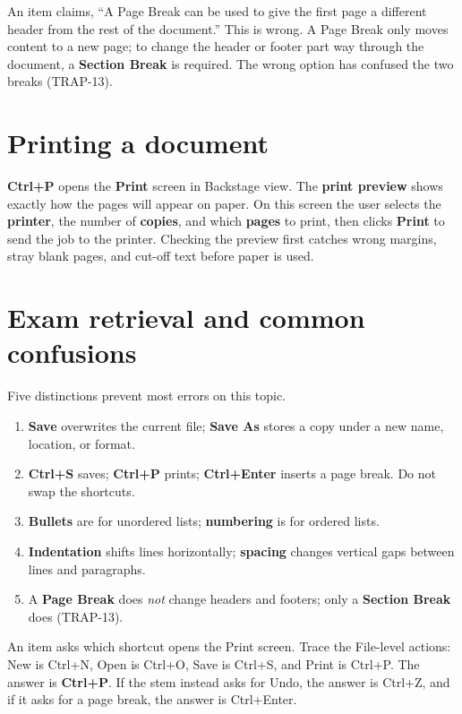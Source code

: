 \begin{example}
An item claims, ``A Page Break can be used to give the first page a
different header from the rest of the document.'' This is wrong. A Page
Break only moves content to a new page; to change the header or footer part
way through the document, a \textbf{Section Break} is required. The wrong
option has confused the two breaks (TRAP-13).
\end{example}

\section{Printing a document}
\textbf{Ctrl+P} opens the \textbf{Print} screen in Backstage view. The
\textbf{print preview} shows exactly how the pages will appear on paper. On
this screen the user selects the \textbf{printer}, the number of
\textbf{copies}, and which \textbf{pages} to print, then clicks \textbf{Print}
to send the job to the printer. Checking the preview first catches wrong
margins, stray blank pages, and cut-off text before paper is used.

\section{Exam retrieval and common confusions}
Five distinctions prevent most errors on this topic.
\begin{enumerate}
  \item \textbf{Save} overwrites the current file; \textbf{Save As} stores a
    copy under a new name, location, or format.
  \item \textbf{Ctrl+S} saves; \textbf{Ctrl+P} prints; \textbf{Ctrl+Enter}
    inserts a page break. Do not swap the shortcuts.
  \item \textbf{Bullets} are for unordered lists; \textbf{numbering} is for
    ordered lists.
  \item \textbf{Indentation} shifts lines horizontally; \textbf{spacing}
    changes vertical gaps between lines and paragraphs.
  \item A \textbf{Page Break} does \emph{not} change headers and footers;
    only a \textbf{Section Break} does (TRAP-13).
\end{enumerate}

\begin{example}
An item asks which shortcut opens the Print screen. Trace the File-level
actions: New is Ctrl+N, Open is Ctrl+O, Save is Ctrl+S, and Print is
Ctrl+P. The answer is \textbf{Ctrl+P}. If the stem instead asks for Undo, the
answer is Ctrl+Z, and if it asks for a page break, the answer is Ctrl+Enter.
\end{example}

